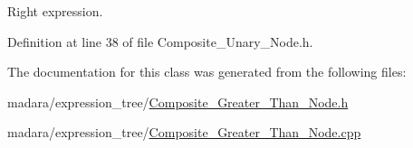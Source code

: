 Right expression. 



Definition at line 38 of file Composite\_\-Unary\_\-Node.h.



The documentation for this class was generated from the following files:\begin{DoxyCompactItemize}
\item 
madara/expression\_\-tree/\hyperlink{Composite__Greater__Than__Node_8h}{Composite\_\-Greater\_\-Than\_\-Node.h}\item 
madara/expression\_\-tree/\hyperlink{Composite__Greater__Than__Node_8cpp}{Composite\_\-Greater\_\-Than\_\-Node.cpp}\end{DoxyCompactItemize}
